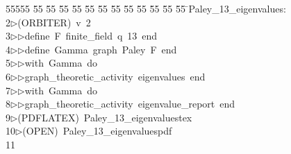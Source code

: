 %
%
\begin{tabbing}
55555 \= 55 \= 55 \= 55 \= 55 \= 55 \= 55 \= 55 \= 55 \= 55 \= 55 \= 55 \= 55 \= \>Paley\_13\_eigenvalues:\\[0pt]
2\>$\triangleright$\>(ORBITER)\ v\ 2\ \\[0pt]
3\>$\triangleright$\>$\triangleright$\>define\ F\ finite\_field\ q\ 13\ end\ \\[0pt]
4\>$\triangleright$\>$\triangleright$\>define\ Gamma\ graph\ Paley\ F\ end\ \\[0pt]
5\>$\triangleright$\>$\triangleright$\>with\ Gamma\ do\ \\[0pt]
6\>$\triangleright$\>$\triangleright$\>graph\_theoretic\_activity\ eigenvalues\ end\ \\[0pt]
7\>$\triangleright$\>$\triangleright$\>with\ Gamma\ do\ \\[0pt]
8\>$\triangleright$\>$\triangleright$\>graph\_theoretic\_activity\ eigenvalue\_report\ end\\[0pt]
9\>$\triangleright$\>(PDFLATEX)\ Paley\_13\_eigenvaluestex\\[0pt]
10\>$\triangleright$\>(OPEN)\ Paley\_13\_eigenvaluespdf\\[0pt]
11\>\end{tabbing}
